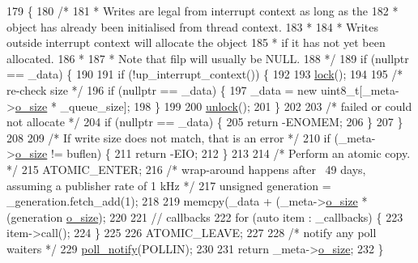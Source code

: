 \begin{DoxyCode}
179 \{
180     \textcolor{comment}{/*}
181 \textcolor{comment}{     * Writes are legal from interrupt context as long as the}
182 \textcolor{comment}{     * object has already been initialised from thread context.}
183 \textcolor{comment}{     *}
184 \textcolor{comment}{     * Writes outside interrupt context will allocate the object}
185 \textcolor{comment}{     * if it has not yet been allocated.}
186 \textcolor{comment}{     *}
187 \textcolor{comment}{     * Note that filp will usually be NULL.}
188 \textcolor{comment}{     */}
189     \textcolor{keywordflow}{if} (\textcolor{keyword}{nullptr} == \_data) \{
190 
191         \textcolor{keywordflow}{if} (!up\_interrupt\_context()) \{
192 
193             \hyperlink{classcdev_1_1CDev_ae676cccee31dd393ab681414a146d868}{lock}();
194 
195             \textcolor{comment}{/* re-check size */}
196             \textcolor{keywordflow}{if} (\textcolor{keyword}{nullptr} == \_data) \{
197                 \_data = \textcolor{keyword}{new} uint8\_t[\_meta->\hyperlink{structorb__metadata_a400a86fe707613e881b620cde7888b74}{o\_size} * \_queue\_size];
198             \}
199 
200             \hyperlink{classcdev_1_1CDev_af65273e0578b277deea057dc7d558e9d}{unlock}();
201         \}
202 
203         \textcolor{comment}{/* failed or could not allocate */}
204         \textcolor{keywordflow}{if} (\textcolor{keyword}{nullptr} == \_data) \{
205             \textcolor{keywordflow}{return} -ENOMEM;
206         \}
207     \}
208 
209     \textcolor{comment}{/* If write size does not match, that is an error */}
210     \textcolor{keywordflow}{if} (\_meta->\hyperlink{structorb__metadata_a400a86fe707613e881b620cde7888b74}{o\_size} != buflen) \{
211         \textcolor{keywordflow}{return} -EIO;
212     \}
213 
214     \textcolor{comment}{/* Perform an atomic copy. */}
215     ATOMIC\_ENTER;
216     \textcolor{comment}{/* wrap-around happens after ~49 days, assuming a publisher rate of 1 kHz */}
217     \textcolor{keywordtype}{unsigned} generation = \_generation.fetch\_add(1);
218 
219     memcpy(\_data + (\_meta->\hyperlink{structorb__metadata_a400a86fe707613e881b620cde7888b74}{o\_size} * (generation %
      \hyperlink{structorb__metadata_a400a86fe707613e881b620cde7888b74}{o\_size});
220 
221     \textcolor{comment}{// callbacks}
222     \textcolor{keywordflow}{for} (\textcolor{keyword}{auto} item : \_callbacks) \{
223         item->call();
224     \}
225 
226     ATOMIC\_LEAVE;
227 
228     \textcolor{comment}{/* notify any poll waiters */}
229     \hyperlink{classcdev_1_1CDev_aa23e0fac4d51f7b14db7a7e7dfa0ac06}{poll\_notify}(POLLIN);
230 
231     \textcolor{keywordflow}{return} \_meta->\hyperlink{structorb__metadata_a400a86fe707613e881b620cde7888b74}{o\_size};
232 \}
\end{DoxyCode}


